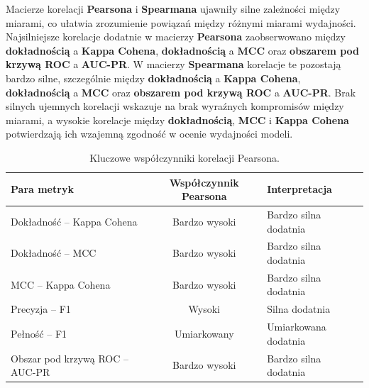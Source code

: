 Macierze korelacji \textbf{Pearsona} i \textbf{Spearmana} ujawniły silne zależności między miarami, co ułatwia zrozumienie powiązań między różnymi miarami wydajności. Najsilniejsze korelacje dodatnie w macierzy \textbf{Pearsona} zaobserwowano między \textbf{dokładnością} a \textbf{Kappa Cohena}, \textbf{dokładnością} a \textbf{MCC} oraz \textbf{obszarem pod krzywą ROC} a \textbf{AUC-PR}. W macierzy \textbf{Spearmana} korelacje te pozostają bardzo silne, szczególnie między \textbf{dokładnością} a \textbf{Kappa Cohena}, \textbf{dokładnością} a \textbf{MCC} oraz \textbf{obszarem pod krzywą ROC} a \textbf{AUC-PR}. Brak silnych ujemnych korelacji wskazuje na brak wyraźnych kompromisów między miarami, a wysokie korelacje między \textbf{dokładnością}, \textbf{MCC} i \textbf{Kappa Cohena} potwierdzają ich wzajemną zgodność w ocenie wydajności modeli.

\begin{table}[H]
	\centering
	\caption{Kluczowe współczynniki korelacji Pearsona.}
	\label{tab:welfake_pearson_correlations}
	\begin{tabular}{l c l}
		\toprule
		\textbf{Para metryk}            & \textbf{Współczynnik Pearsona} & \textbf{Interpretacja} \\
		\midrule
		Dokładność -- Kappa Cohena      & Bardzo wysoki                  & Bardzo silna dodatnia  \\
		Dokładność -- MCC               & Bardzo wysoki                  & Bardzo silna dodatnia  \\
		MCC -- Kappa Cohena             & Bardzo wysoki                  & Bardzo silna dodatnia  \\
		Precyzja -- F1                  & Wysoki                         & Silna dodatnia         \\
		Pełność -- F1                   & Umiarkowany                    & Umiarkowana dodatnia   \\
		Obszar pod krzywą ROC -- AUC-PR & Bardzo wysoki                  & Bardzo silna dodatnia  \\
		\bottomrule
	\end{tabular}
\end{table}


